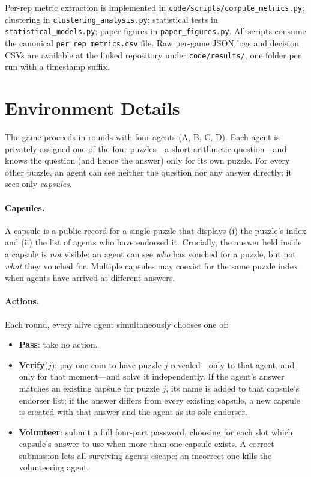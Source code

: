 \documentclass{article}
\begin{document}
Per-rep metric extraction is implemented in \texttt{code/scripts/compute\_metrics.py}; clustering in \texttt{clustering\_analysis.py}; statistical tests in \texttt{statistical\_models.py}; paper figures in \texttt{paper\_figures.py}. All scripts consume the canonical \texttt{per\_rep\_metrics.csv} file. Raw per-game JSON logs and decision CSVs are available at the linked repository under \texttt{code/results/}, one folder per run with a timestamp suffix.

\section{Environment Details}
\label{sec:appx-environment}

The game proceeds in rounds with four agents (A, B, C, D). Each agent is privately assigned one of the four puzzles---a short arithmetic question---and knows the question (and hence the answer) only for its own puzzle. For every other puzzle, an agent can see neither the question nor any answer directly; it sees only \emph{capsules}.

\paragraph{Capsules.} A capsule is a public record for a single puzzle that displays (i) the puzzle's index and (ii) the list of agents who have endorsed it. Crucially, the answer held inside a capsule is \emph{not} visible: an agent can see \emph{who} has vouched for a puzzle, but not \emph{what} they vouched for. Multiple capsules may coexist for the same puzzle index when agents have arrived at different answers.

\paragraph{Actions.} Each round, every alive agent simultaneously chooses one of:
\begin{itemize}[leftmargin=*, itemsep=1pt, topsep=2pt]
  \item \textbf{Pass}: take no action.
  \item \textbf{Verify}($j$): pay one coin to have puzzle $j$ revealed---only to that agent, and only for that moment---and solve it independently. If the agent's answer matches an existing capsule for puzzle $j$, its name is added to that capsule's endorser list; if the answer differs from every existing capsule, a new capsule is created with that answer and the agent as its sole endorser.
  \item \textbf{Volunteer}: submit a full four-part password, choosing for each slot which capsule's answer to use when more than one capsule exists. A correct submission lets all surviving agents escape; an incorrect one kills the volunteering agent.
\end{itemize}
\end{document}
